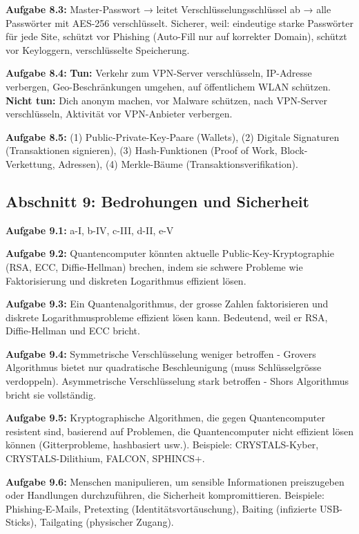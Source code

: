 \documentclass[11pt,a4paper]{report}
\begin{document}
\textbf{Aufgabe 8.3:}
Master-Passwort → leitet Verschlüsselungsschlüssel ab → alle Passwörter mit AES-256 verschlüsselt. Sicherer, weil: eindeutige starke Passwörter für jede Site, schützt vor Phishing (Auto-Fill nur auf korrekter Domain), schützt vor Keyloggern, verschlüsselte Speicherung.

\textbf{Aufgabe 8.4:}
\textbf{Tun:} Verkehr zum VPN-Server verschlüsseln, IP-Adresse verbergen, Geo-Beschränkungen umgehen, auf öffentlichem WLAN schützen. \textbf{Nicht tun:} Dich anonym machen, vor Malware schützen, nach VPN-Server verschlüsseln, Aktivität vor VPN-Anbieter verbergen.

\textbf{Aufgabe 8.5:}
(1) Public-Private-Key-Paare (Wallets), (2) Digitale Signaturen (Transaktionen signieren), (3) Hash-Funktionen (Proof of Work, Block-Verkettung, Adressen), (4) Merkle-Bäume (Transaktionsverifikation).

\subsection*{Abschnitt 9: Bedrohungen und Sicherheit}

\textbf{Aufgabe 9.1:}
a-I, b-IV, c-III, d-II, e-V

\textbf{Aufgabe 9.2:}
Quantencomputer könnten aktuelle Public-Key-Kryptographie (RSA, ECC, Diffie-Hellman) brechen, indem sie schwere Probleme wie Faktorisierung und diskreten Logarithmus effizient lösen.

\textbf{Aufgabe 9.3:}
Ein Quantenalgorithmus, der grosse Zahlen faktorisieren und diskrete Logarithmusprobleme effizient lösen kann. Bedeutend, weil er RSA, Diffie-Hellman und ECC bricht.

\textbf{Aufgabe 9.4:}
Symmetrische Verschlüsselung weniger betroffen - Grovers Algorithmus bietet nur quadratische Beschleunigung (muss Schlüsselgrösse verdoppeln). Asymmetrische Verschlüsselung stark betroffen - Shors Algorithmus bricht sie vollständig.

\textbf{Aufgabe 9.5:}
Kryptographische Algorithmen, die gegen Quantencomputer resistent sind, basierend auf Problemen, die Quantencomputer nicht effizient lösen können (Gitterprobleme, hashbasiert usw.). Beispiele: CRYSTALS-Kyber, CRYSTALS-Dilithium, FALCON, SPHINCS+.

\textbf{Aufgabe 9.6:}
Menschen manipulieren, um sensible Informationen preiszugeben oder Handlungen durchzuführen, die Sicherheit kompromittieren. Beispiele: Phishing-E-Mails, Pretexting (Identitätsvortäuschung), Baiting (infizierte USB-Sticks), Tailgating (physischer Zugang).
\end{document}
